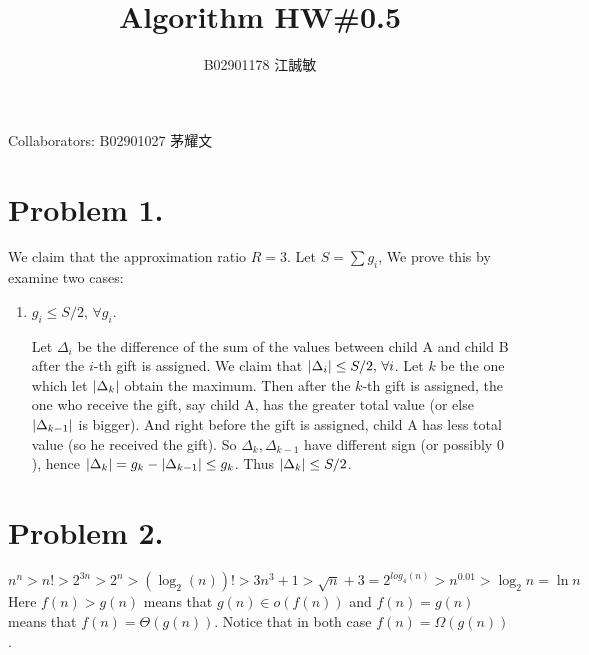 \documentclass[12pt, a4paper]{article}
\title{Algorithm HW\#0.5}
\author{B02901178 江誠敏}
\DeclarePairedDelimiter{\abs}{\lvert}{\rvert}
\begin{document}
\maketitle
Collaborators: B02901027 茅耀文
\section{Problem 1.}

We claim that the approximation ratio $R = 3$.
Let $S = \sum g_i$, We prove this by examine two cases:
\begin{enumerate}[label=Case \arabic*:]
  \item $g_i \leq S/2, \, \forall g_i$.

    Let $\Delta_i$ be the difference of the sum of the values between child A and child B
    after the $i$-th gift is assigned.
    We claim that $\abs{\Delta_i} \leq S/2, \, \forall i$. Let $k$ be the one which let $\abs{\Delta_k}$
    obtain the maximum. Then after the $k$-th gift is assigned, the one who receive the gift, say child A,
    has the greater total value (or else $\abs{\Delta_{k-1}}$ is bigger). And right before the gift is assigned,
    child A has less total value (so he received the gift). So $\Delta_k, \Delta_{k-1}$ have different sign
    (or possibly $0$), hence $\abs{\Delta_k} = g_k - \abs{\Delta_{k-1}} \leq g_k$. Thus $\abs{\Delta_k} \leq S/2$.

\end{enumerate}

\section{Problem 2.}
\[ n^n > n! > 2^{3n} > 2^n > (\log_2(n))! > 3n^3 + 1 > \sqrt{n} + 3 = 2^{log_4(n)} > n^{0.01} > \log_2 n = \ln n \]
Here $f(n) > g(n)$ means that $g(n) \in o(f(n))$ and $f(n) = g(n)$ means that $f(n) = \Theta(g(n))$.
Notice that in both case $f(n) = \Omega(g(n))$.
\end{document}
